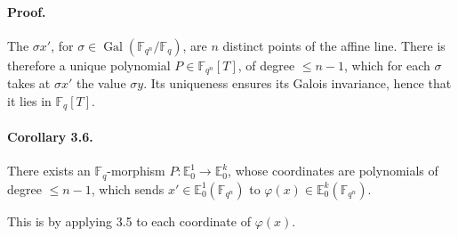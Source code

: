\documentclass[11pt]{article}
\newcommand{\F}{\mathbb{F}}
\newcommand{\Gal}{\operatorname{Gal}}
\begin{document}
\paragraph{Proof.}
The $\sigma x'$, for $\sigma\in\Gal(\F_{q^n}/\F_q)$, are $n$ distinct points of the affine line.
There is therefore a unique polynomial $P\in\F_{q^n}[T]$, of degree $\le n-1$, which for each $\sigma$ takes at $\sigma x'$ the value $\sigma y$.
Its uniqueness ensures its Galois invariance, hence that it lies in $\F_q[T]$.

\paragraph{Corollary 3.6.}
There exists an $\F_q$-morphism $P:\mathbb E^1_0\to\mathbb E^k_0$, whose coordinates are polynomials of degree $\le n-1$, which sends $x'\in\mathbb E^1_0(\F_{q^n})$ to $\varphi(x)\in\mathbb E^k_0(\F_{q^n})$.

This is  by applying 3.5 to each coordinate of $\varphi(x)$.
\end{document}
